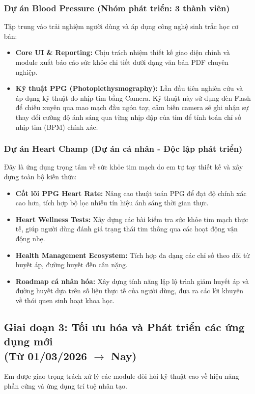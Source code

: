 \documentclass[12pt, a4paper]{article}
\begin{document}
\subsubsection{Dự án Blood Pressure (Nhóm phát triển: 3 thành viên)}
Tập trung vào trải nghiệm người dùng và áp dụng công nghệ sinh trắc học cơ bản:
\begin{itemize}
    \item \textbf{Core UI \& Reporting:} Chịu trách nhiệm thiết kế giao diện chính và module xuất báo cáo sức khỏe chi tiết dưới dạng văn bản PDF chuyên nghiệp.
    \item \textbf{Kỹ thuật PPG (Photoplethysmography):} Lần đầu tiên nghiên cứu và áp dụng kỹ thuật đo nhịp tim bằng Camera. Kỹ thuật này sử dụng đèn Flash để chiếu xuyên qua mao mạch đầu ngón tay, cảm biến camera sẽ ghi nhận sự thay đổi cường độ ánh sáng qua từng nhịp đập của tim để tính toán chỉ số nhịp tim (BPM) chính xác.
\end{itemize}

\subsubsection{Dự án Heart Champ (Dự án cá nhân - Độc lập phát triển)}
Đây là ứng dụng trọng tâm về sức khỏe tim mạch do em tự tay thiết kế và xây dựng toàn bộ kiến thức:
\begin{itemize}
    \item \textbf{Cốt lõi PPG Heart Rate:} Nâng cao thuật toán PPG để đạt độ chính xác cao hơn, tích hợp bộ lọc nhiễu tín hiệu ánh sáng thời gian thực.
    \item \textbf{Heart Wellness Tests:} Xây dựng các bài kiểm tra sức khỏe tim mạch thực tế, giúp người dùng đánh giá trạng thái tim thông qua các hoạt động vận động nhẹ.
    \item \textbf{Health Management Ecosystem:} Tích hợp đa dạng các chỉ số theo dõi từ huyết áp, đường huyết đến cân nặng.
    \item \textbf{Roadmap cá nhân hóa:} Xây dựng tính năng lập lộ trình giảm huyết áp và đường huyết dựa trên số liệu thực tế của người dùng, đưa ra các lời khuyên về thói quen sinh hoạt khoa học.
\end{itemize}

\subsection[Giai đoạn 3: Tối ưu hóa và Phát triển các ứng dụng mới (Từ 01/03/2026 đến nay)]{Giai đoạn 3: Tối ưu hóa và Phát triển các ứng dụng mới \\(Từ 01/03/2026 $\rightarrow$ Nay)}
Em được giao trọng trách xử lý các module đòi hỏi kỹ thuật cao về hiệu năng phần cứng và ứng dụng trí tuệ nhân tạo.
\end{document}
